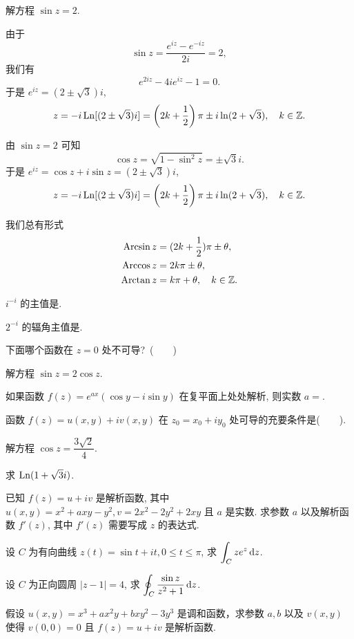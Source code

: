 \begin{example}
  解方程 $\sin z=2$.
\end{example}

\begin{solution}
  由于
  \[\sin z=\dfrac{e^{iz}-e^{-iz}}{2i}=2,\]
  我们有
  \[e^{2iz}-4ie^{iz}-1=0.\]
  于是 $e^{iz}=(2\pm\sqrt 3)i$,
  \[z=-i\operatorname{Ln}[(2\pm\sqrt 3)i]=\left(2k+\frac{1}{2}\right)\pi\pm i\ln(2+\sqrt3),\quad k\in{\mathbb{Z}}.\]
\end{solution}

\begin{solution}[另解]
  由 $\sin z=2$ 可知
  \[\cos z=\sqrt{1-\sin^2 z}=\pm\sqrt 3i.\]
  于是 $e^{iz}=\cos z+i\sin z=(2\pm\sqrt 3)i$,
    \[z=-i\operatorname{Ln}[(2\pm\sqrt 3)i]=\left(2k+\frac{1}{2}\right)\pi\pm i\ln(2+\sqrt3),\quad k\in{\mathbb{Z}}.\]
\end{solution}
我们总有形式
\begin{align*}
  \operatorname{Arcsin} z&=(2k+\frac{1}{2})\pi\pm \theta,\\
  \operatorname{Arccos} z&=2k\pi\pm \theta,\\
  \operatorname{Arctan} z&=k\pi+\theta,\quad k\in{\mathbb{Z}}.
\end{align*}


\sectionHomework




\item $i^{-i}$ 的主值是\fillblank{}.
\item $2^{-i}$ 的辐角主值是\fillblank{}.
\item 下面哪个函数在 $z=0$ 处不可导?~(~~~~)
\item 解方程 $\sin z=2\cos z$.
\item 如果函数 $f(z)=e^{ax}(\cos y-i\sin y)$ 在复平面上处处解析, 则实数 $a=$\fillblank{}.
\item 函数 $f(z)=u(x,y)+iv(x,y)$ 在 $z_0=x_0+iy_0$ 处可导的充要条件是(~~~~).
\item 解方程 $\cos z=\dfrac{3\sqrt2}4$.
\item 求 $\operatorname{Ln}(1+\sqrt3i)$.
\item 已知 $f(z)=u+iv$ 是解析函数, 其中 $u(x,y)=x^2+axy-y^2, v=2x^2-2y^2+2xy$ 且 $a$ 是实数.
求参数 $a$ 以及解析函数 $f'(z)$, 其中 $f'(z)$ 需要写成 $z$ 的表达式.
\item 设 $C$ 为有向曲线 $z(t)=\sin t+it,0\le t\le \pi$, 求 $\displaystyle\int_C ze^z \,\mathrm{d} z$.
\item 设 $C$ 为正向圆周 $|z-1|=4$, 求 $\displaystyle\oint_C\frac{\sin z}{z^2+1}\,\mathrm{d} z$.
\item 假设 $u(x,y)=x^3+ax^2y+bxy^2-3y^3$ 是调和函数，求参数 $a,b$ 以及 $v(x,y)$ 使得 $v(0,0)=0$ 且 $f(z)=u+iv$ 是解析函数.






